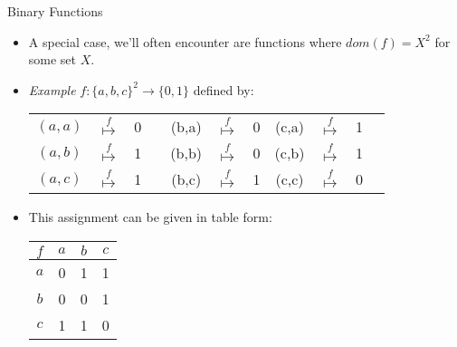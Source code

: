 \begin{frame}{Binary Functions}

	\begin{itemize}
	
		\item A special case, we'll often encounter are functions where $dom(f)=X^2$ for some set $X$.
		
		\item \emph{Example} $f:\{a,b,c\}^2\to \{0,1\}$ defined by:
		
		\begin{center}
	\begin{tabular}{c c c c c c c c c c c}
	$(a,a)$ & $\overset{f}{\mapsto}$ & 0 & \quad & (b,a) & $\overset{f}{\mapsto}$ & 0  \quad & (c,a) & $\overset{f}{\mapsto}$ & 1\\

	$(a,b)$ & $\overset{f}{\mapsto}$ & 1 & \quad & (b,b) & $\overset{f}{\mapsto}$ & 0  \quad & (c,b) & $\overset{f}{\mapsto}$ & 1\\


	$(a,c)$ & $\overset{f}{\mapsto}$ & 1 & \quad & (b,c) & $\overset{f}{\mapsto}$ & 1  \quad & (c,c) & $\overset{f}{\mapsto}$ & 0\\


	\end{tabular}
\end{center}

	\item This assignment can be given in table form:

\begin{center}
	\begin{tabular}{ c | c c c}
	$f$ & $a$ & $b$ & $c$ \\ \hline
	
	$a$ & 0 & 1 & 1\\
	
	$b$ & 0 & 0 & 1\\
	
	$c$ & 1 & 1 & 0
	
	\end{tabular} 
	
\end{center}
	
	\end{itemize}

\end{frame}


